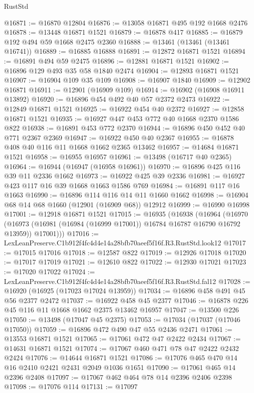 \begin{lexlean}{RustStd}
\begin{coremodule}
@16871 := @16870 @12804
@16876 := @13058 @16871 @495 @192 @1668 @2476
@16878 := @13448 @16871 @1521
@16879 := @16878 @417
@16885 := @16879 @192 @494 @59 @1668 @2475 @2360
@16888 := @13461 (@13461 (@13461 @16741))
@16889 := @16885 @16888
@16891 := @12872 @16871 @1521
@16894 := @16891 @494 @59 @2475
@16896 := @12881 @16871 @1521
@16902 := @16896 @129 @493 @35 @58 @1840 @2474
@16904 := @12893 @16871 @1521
@16907 := @16904 @109 @35 @109
@16908 := @16907 @1840
@16909 := @12902 @16871
@16911 := @12901 (@16909 @109)
@16914 := @16902 (@16908 @16911 @13892)
@16920 := @16896 @454 @492 @40 @57 @2372 @2473
@16922 := @12849 @16871 @1521
@16925 := @16922 @454 @40 @2372
@16927 := @12858 @16871 @1521
@16935 := @16927 @447 @453 @772 @40 @1668 @2370 @1586 @822
@16938 := @16891 @453 @772 @2370
@16944 := @16896 @450 @452 @40 @771 @2367 @2369
@16947 := @16922 @450 @40 @2367
@16955 := @16878 @408 @40 @116 @11 @1668 @1662 @2365 @13462
@16957 := @14684 @16871 @1521
@16958 := @16955 @16957
@16961 := @13498 (@16717 @40 @2365)
@16964 := @16944 (@16947 (@16958 @16961))
@16970 := @16896 @425 @116 @39 @11 @2336 @1662
@16973 := @16922 @425 @39 @2336
@16981 := @16927 @423 @117 @16 @39 @1668 @1663 @1586 @769
@16984 := @16891 @117 @16 @1663
@16990 := @16896 @114 @116 @14 @11 @1660 @1662
@16998 := @16904 @68 @14 @68 @1660 (@12901 (@16909 @68)) @12912
@16999 := @16990 @16998
@17001 := @12918 @16871 @1521
@17015 := @16935
    (@16938
      (@16964
        (@16970
          (@16973 (@16981 (@16984 (@16999 @17001)) @16784 @16787 @16790 @16792 @13959))
          @17001)))
@17016 := LexLeanPreserve.C1b912f4fc4d4e14a28bfb70aeef5f16f.R3.RustStd.look12
@17017 := @17015 @17016
@17018 := @12587 @822
@17019 := @12926 @17018
@17020 := @17017 @17019
@17021 := @12610 @822
@17022 := @12930 @17021
@17023 := @17020 @17022
@17024 := LexLeanPreserve.C1b912f4fc4d4e14a28bfb70aeef5f16f.R3.RustStd.fal12
@17028 := @16920 (@16925 (@17023 @17024 @13959))
@17034 := @16896 @458 @491 @45 @56 @2377 @2472
@17037 := @16922 @458 @45 @2377
@17046 := @16878 @226 @45 @116 @11 @1668 @1662 @2375 @13462 @16957
@17047 := @13500 @226
@17050 := @13498 (@17047 @45 @2375)
@17053 := @17034 (@17037 (@17046 @17050))
@17059 := @16896 @472 @490 @47 @55 @2436 @2471
@17061 := @13553 @16871 @1521
@17065 := @17061 @472 @47 @2422 @2434
@17067 := @14631 @16871 @1521
@17074 := @17067 @460 @471 @78 @47 @2422 @2432 @2424
@17076 := @14644 @16871 @1521
@17086 := @17076 @465 @470 @14 @16 @2410 @2421 @2431 @2049 @1036 @1651
@17090 := @17061 @465 @14 @2396 @2408
@17097 := @17067 @462 @464 @78 @14 @2396 @2406 @2398
@17098 := @17076 @114
@17131 := @17097

\end{coremodule}
\end{lexlean}

